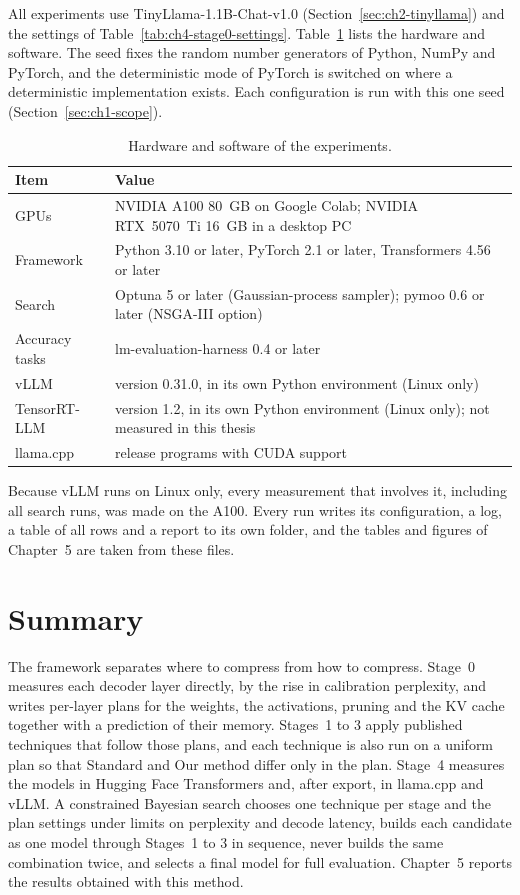 All experiments use TinyLlama-1.1B-Chat-v1.0 (Section~\ref{sec:ch2-tinyllama}) and the settings of Table~\ref{tab:ch4-stage0-settings}. Table~\ref{tab:ch4-setup} lists the hardware and software. The seed fixes the random number generators of Python, NumPy and PyTorch, and the deterministic mode of PyTorch is switched on where a deterministic implementation exists. Each configuration is run with this one seed (Section~\ref{sec:ch1-scope}).

\begin{table}[htbp]
\centering
\small
\caption{Hardware and software of the experiments.}
\label{tab:ch4-setup}
\renewcommand{\arraystretch}{1.2}
\begin{tabularx}{\textwidth}{lX}
\hline
\textbf{Item} & \textbf{Value} \\
\hline
GPUs & NVIDIA A100 80~GB on Google Colab; NVIDIA RTX~5070~Ti 16~GB in a desktop PC \\
Framework & Python 3.10 or later, PyTorch 2.1 or later, Transformers 4.56 or later \\
Search & Optuna 5 or later (Gaussian-process sampler); pymoo 0.6 or later (NSGA-III option) \\
Accuracy tasks & lm-evaluation-harness 0.4 or later \\
vLLM & version 0.31.0, in its own Python environment (Linux only) \\
TensorRT-LLM & version 1.2, in its own Python environment (Linux only); not measured in this thesis \\
llama.cpp & release programs with CUDA support \\
\hline
\end{tabularx}
\end{table}

Because vLLM runs on Linux only, every measurement that involves it, including all search runs, was made on the A100. Every run writes its configuration, a log, a table of all rows and a report to its own folder, and the tables and figures of Chapter~5 are taken from these files.

\section{Summary}
\label{sec:ch4-summary}

The framework separates where to compress from how to compress. Stage~0 measures each decoder layer directly, by the rise in calibration perplexity, and writes per-layer plans for the weights, the activations, pruning and the KV cache together with a prediction of their memory. Stages~1 to 3 apply published techniques that follow those plans, and each technique is also run on a uniform plan so that Standard and Our method differ only in the plan. Stage~4 measures the models in Hugging Face Transformers and, after export, in llama.cpp and vLLM. A constrained Bayesian search chooses one technique per stage and the plan settings under limits on perplexity and decode latency, builds each candidate as one model through Stages~1 to 3 in sequence, never builds the same combination twice, and selects a final model for full evaluation. Chapter~5 reports the results obtained with this method.
